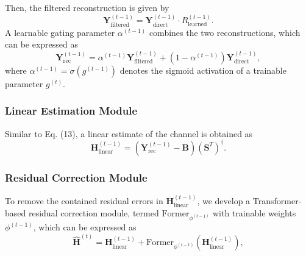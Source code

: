 \documentclass[journal]{IEEEtran}
\begin{document}
Then, the filtered reconstruction is given by
\begin{equation}
    \mathbf{Y}_{\text{filtered}}^{(t-1)}  = \mathbf{Y}_{\text{direct}}^{(t-1)}  {\cdot} R_{\text{learned}}^{(t-1)} .
    \label{eq:l_emgs_y_filtered}
\end{equation}
A learnable gating parameter $\alpha^{(t-1)} $ combines the two reconstructions, which can be expressed as
\begin{equation}
    \mathbf{Y}_{\text{rec}}^{(t-1)}  = \alpha^{(t-1)}  \mathbf{Y}_{\text{filtered}}^{(t-1)} + (1-\alpha^{(t-1)} ) \mathbf{Y}_{\text{direct}}^{(t-1)} ,
    \label{eq:l_emgs_y_gated}
\end{equation}
where $\alpha^{(t-1)}  = \sigma(g^{(t-1)})$ denotes the sigmoid activation of a trainable parameter $g^{(t)}$.

\subsubsection{Linear Estimation Module} Similar to Eq. (13), a linear estimate of the channel is obtained as
\begin{equation}
    \mathbf{H}_{\text{linear}}^{(t-1)}  = (\mathbf{Y}_{\text{rec}}^{(t-1)}  - \mathbf{B}) (\mathbf{S}^T)^{\dagger}.
    \label{eq:l_emgs_h_linear}
\end{equation}

\subsubsection{Residual Correction Module} To remove the contained residual errors in $\mathbf{H}_{\text{linear}}^{(t-1)} $, we develop a Transformer-based residual correction module, termed $\text{Former}_{{\phi}^{(t-1)}}$ with trainable weights ${\phi}^{(t-1)} $, which can be expressed as
\begin{equation}
    \hat{\mathbf{H}}^{(t)} = \mathbf{H}_{\text{linear}}^{(t-1)}  + \text{Former}_{{\phi}^{(t-1)}} (\mathbf{H}_{\text{linear}}^{(t-1)} ),
    \label{eq:l_emgs_h_out}
\end{equation}
\end{document}
